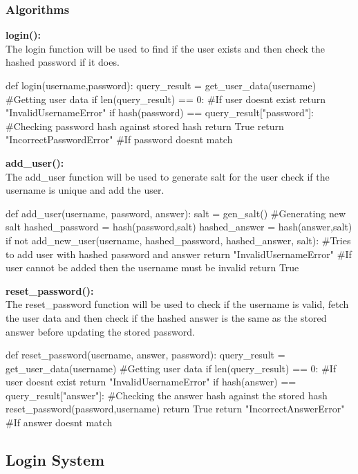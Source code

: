 \documentclass{article}
\begin{document}
        \subsubsection{Algorithms}
        \textbf{login():}\\
        The login function will be used to find if the user exists and then check the hashed password if it does.\\
        \begin{python}
def login(username,password):
   query_result = get_user_data(username) #Getting user data
   if len(query_result) == 0: #If user doesnt exist
      return "InvalidUsernameError" 
   if hash(password) == query_result["password"]: #Checking password hash against stored hash
      return True
   return "IncorrectPasswordError" #If password doesnt match
        \end{python}
        \textbf{add\_user():}\\
        The add\_user function will be used to generate salt for the user check if the username is unique and add the user.\\
        \begin{python}
def add_user(username, password, answer):
   salt = gen_salt() #Generating new salt
   hashed_password = hash(password,salt)
   hashed_answer = hash(answer,salt)
   if not add_new_user(username, hashed_password, hashed_answer, salt): #Tries to add user with hashed password and answer
      return "InvalidUsernameError" #If user cannot be added then the username must be invalid
   return True
        \end{python}
        \textbf{reset\_password():}\\
        The reset\_password function will be used to check if the username is valid, fetch the user data and then check if the hashed answer is the same as the stored answer before updating the stored password.\\
        \begin{python}
def reset_password(username, answer, password):
   query_result = get_user_data(username) #Getting user data
   if len(query_result) == 0: #If user doesnt exist
      return "InvalidUsernameError"
   if hash(answer) == query_result["answer"]: #Checking the answer hash against the stored hash
      reset_password(password,username)
      return True
   return "IncorrectAnswerError" #If answer doesnt match
        \end{python}
        \subsection{Login System}
\end{document}

